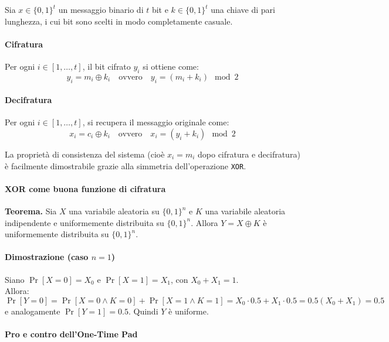 \documentclass{report}
\begin{document}
    Sia $x \in \{0,1\}^t$ un messaggio binario di $t$ bit e $k \in \{0,1\}^t$ una chiave di pari lunghezza, i cui bit sono scelti in modo completamente casuale.
    
    \paragraph{Cifratura}
    
    Per ogni $i \in [1, \dots, t]$, il bit cifrato $y_i$ si ottiene come:
    \[
    y_i = m_i \oplus k_i \quad \text{ovvero} \quad y_i = (m_i + k_i) \mod 2
    \]
    
    \paragraph{Decifratura}
    
    Per ogni $i \in [1, \dots, t]$, si recupera il messaggio originale come:
    \[
    x_i = c_i \oplus k_i \quad \text{ovvero} \quad x_i = (y_i + k_i) \mod 2
    \]
    
    La proprietà di consistenza del sistema (cioè $x_i = m_i$ dopo cifratura e decifratura) è facilmente dimostrabile grazie alla simmetria dell'operazione \texttt{XOR}.
    
    \paragraph{XOR come buona funzione di cifratura}

\textbf{Teorema.} Sia $X$ una variabile aleatoria su $\{0,1\}^n$ e $K$ una variabile aleatoria indipendente e uniformemente distribuita su $\{0,1\}^n$. Allora $Y = X \oplus K$ è uniformemente distribuita su $\{0,1\}^n$.

\paragraph{Dimostrazione (caso $n = 1$)}
Siano $\Pr[X = 0] = X_0$ e $\Pr[X = 1] = X_1$, con $X_0 + X_1 = 1$.\\
Allora:
\[
\Pr[Y = 0] = \Pr[X = 0 \land K = 0] + \Pr[X = 1 \land K = 1] = X_0 \cdot 0.5 + X_1 \cdot 0.5 = 0.5 (X_0 + X_1) = 0.5
\]
e analogamente $\Pr[Y = 1] = 0.5$. Quindi $Y$ è uniforme.

\paragraph{Pro e contro dell'One-Time Pad}
\end{document}
